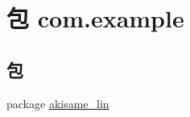 \hypertarget{namespacecom_1_1example}{}\section{包 com.\+example}
\label{namespacecom_1_1example}
\subsection*{包}
\begin{DoxyCompactItemize}
\item 
package \mbox{\hyperlink{namespacecom_1_1example_1_1akisame__lin}{akisame\+\_\+lin}}
\end{DoxyCompactItemize}
